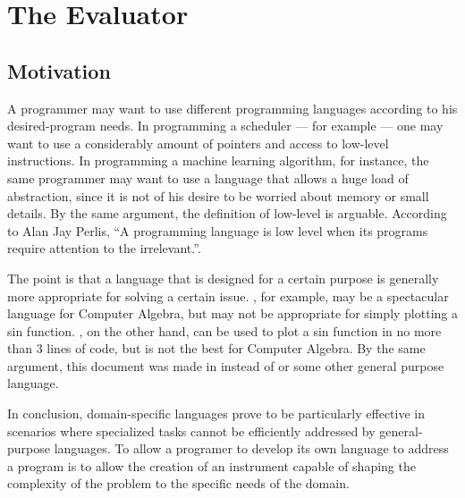 
\chapter{The Evaluator}

\section{Motivation}
\label{section: Motivation}


  A programmer may want to use different programming languages according to his desired-program needs. In programming a scheduler --- for example --- one may want to use a considerably amount of pointers and access to low-level instructions. In programming a machine learning algorithm, for instance, the same programmer may want to use a language that allows a huge load of abstraction, since it is not of his desire to be worried about memory or small details. By the same argument, the definition of low-level is arguable. According to Alan Jay Perlis, ``A programming language is low level when its programs require attention to the irrelevant.\cite{epigrams-alan}''.

  The point is that a language that is designed for a certain purpose is generally more appropriate for solving a certain issue. , for example, may be a spectacular language for Computer Algebra, but may not be appropriate for simply plotting a sin function. , on the other hand, can be used to plot a sin function in no more than 3 lines of code, but is not the best for Computer Algebra. By the same argument, this document was made in  instead of  or some other general purpose language.

  In conclusion, domain-specific languages prove to be particularly effective in scenarios where specialized tasks cannot be efficiently addressed by general-purpose languages. To allow a programer to develop its own language to address a program is to allow the creation of an instrument capable of shaping the complexity of the problem to the specific needs of the domain.


